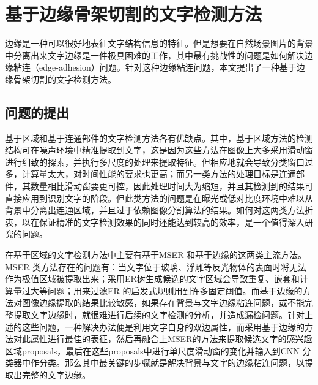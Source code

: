 ﻿%
%
%
%
%
%

\chapter{基于边缘骨架切割的文字检测方法}
\label{sec.c3}

    边缘是一种可以很好地表征文字结构信息的特征。但是想要在自然场景图片的背景中分离出来文字边缘是一件极具困难的工作，其中最有挑战性的问题是如何解决边缘粘连（edge-adhesion）问题。针对这种边缘粘连问题，本文提出了一种基于边缘骨架切割的文字检测方法。

    \section{问题的提出}

    基于区域和基于连通部件的文字检测方法各有优缺点。其中，基于区域方法的检测结构可在噪声环境中精准提取到文字，这是因为这些方法在图像上大多采用滑动窗进行细致的探索，并执行多尺度的处理来提取特征。但相应地就会导致分类窗口过多，计算量太大，对时间性能的要求也更高；而另一类方法的处理目标是连通部件，其数量相比滑动窗要更可控，因此处理时间大为缩短，并且其检测到的结果可直接应用到识别文字的阶段。但此类方法的问题是在曝光或低对比度环境中难以从背景中分离出连通区域，并且过于依赖图像分割算法的结果。如何对这两类方法折衷，以在保证精准的文字检测效果的同时还能达到较高的效率，是一个值得深入研究的问题。

    在基于区域的文字检测方法中主要有基于MSER 和基于边缘的这两类主流方法。MSER 类方法存在的问题有：当文字位于玻璃、浮雕等反光物体的表面时将无法作为极值区域被提取出来；采用ER树生成候选的文字区域会导致重复、嵌套和计算量过大等问题；用来过滤ER 的启发式规则用到许多固定阈值。而基于边缘的方法对图像边缘提取的结果比较敏感，如果存在背景与文字边缘粘连问题，或不能完整提取文字边缘时，就很难进行后续的文字检测的分析，并造成漏检问题。针对上述的这些问题，一种解决办法便是利用文字自身的双边属性，而采用基于边缘的方法对此属性进行最佳的表征，然后再融合上MSER的方法来提取候选文字的感兴趣区域proposals，最后在这些proposals中进行单尺度滑动窗的变化并输入到CNN 分类器中作分类。那么其中最关键的步骤就是解决背景与文字的边缘粘连问题，以提取出完整的文字边缘。

